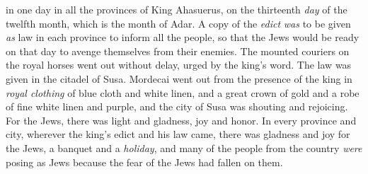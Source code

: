 \begin{biblechapter}
\verse in one day in all the provinces of King Ahasuerus, on the thirteenth \textit{day} of the twelfth month, which is the month of Adar.
\verse A copy of the \textit{edict} \textit{was} to be given \textit{as} law in each province to inform all the people, so that the Jews would be ready on that day to avenge themselves from their enemies.
\verse The mounted couriers on the royal horses went out without delay, urged by the king’s word. The law was given in the citadel of Susa.
\verse Mordecai went out from the presence of the king in \textit{royal clothing} of blue cloth and white linen, and a great crown of gold and a robe of fine white linen and purple, and the city of Susa was shouting and rejoicing.
\verse For the Jews, there was light and gladness, joy and honor.
\verse In every province and city, wherever the king’s edict and his law came, there was gladness and joy for the Jews, a banquet and a \textit{holiday}, and many of the people from the country \textit{were} posing as Jews because the fear of the Jews had fallen on them.
\end{biblechapter}

